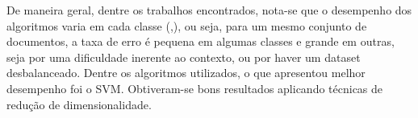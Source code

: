 
De maneira geral, dentre os trabalhos encontrados, nota-se que o desempenho dos algoritmos varia em cada classe (\cite{de_maat_machine_2010},\cite{goncalves_is_2005}), ou seja, para um mesmo conjunto de documentos, a taxa de erro é pequena em algumas classes e grande em outras, seja por uma dificuldade inerente ao contexto, ou por haver um dataset desbalanceado. 
Dentre os algoritmos utilizados, o que apresentou melhor desempenho foi o SVM. Obtiveram-se bons resultados aplicando técnicas de redução de dimensionalidade.
